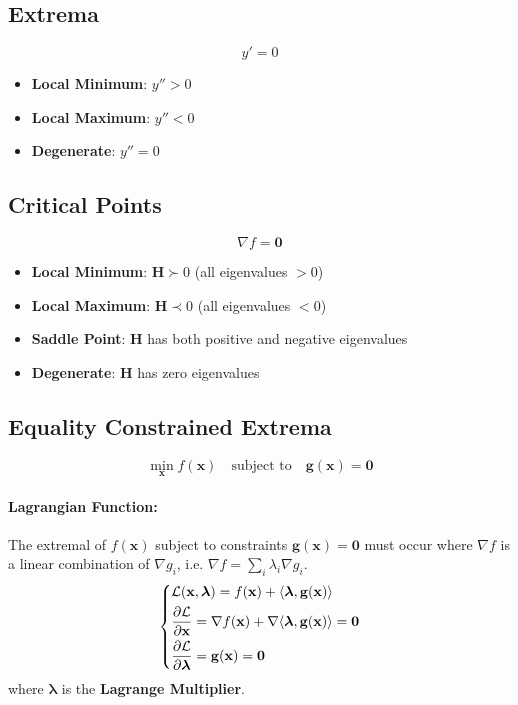 \documentclass{article}
\begin{document}
\subsection{Extrema}
\[
    y' = 0
\]
\begin{itemize}
    \item \textbf{Local Minimum}: $y'' > 0$
    \item \textbf{Local Maximum}: $y'' < 0$
    \item \textbf{Degenerate}: $y'' = 0$
\end{itemize}

\subsection{Critical Points}
\[
    \nabla f = \mathbf{0}
\]
\begin{itemize}
    \item \textbf{Local Minimum}: $\mathbf{H} \succ 0$ (all eigenvalues $> 0$)
    \item \textbf{Local Maximum}: $\mathbf{H} \prec 0$ (all eigenvalues $< 0$)
    \item \textbf{Saddle Point}: $\mathbf{H}$ has both positive and negative eigenvalues
    \item \textbf{Degenerate}: $\mathbf{H}$ has zero eigenvalues
\end{itemize}

\subsection{Equality Constrained Extrema}

\[
    \min_{\mathbf{x}} f(\mathbf{x}) \quad \text{subject to} \quad \mathbf{g}(\mathbf{x}) = \mathbf{0}
\]
\paragraph{Lagrangian Function:}
The extremal of $f(\mathbf{x})$ subject to constraints $\mathbf{g}(\mathbf{x}) = \mathbf{0}$ must occur where $\nabla f$ is a linear combination of $\nabla g_i$, i.e. $\displaystyle \nabla f = \sum_{i} \lambda_i \nabla g_i$.
\[
    \begin{dcases}
        \mathcal{L}(\mathbf{x}, \boldsymbol{\lambda}) = f(\mathbf{x}) + \langle \boldsymbol{\lambda}, \mathbf{g}(\mathbf{x}) \rangle \\
        \frac{\partial \mathcal{L}}{\partial \mathbf{x}} = \nabla f(\mathbf{x}) + \nabla \langle \boldsymbol{\lambda}, \mathbf{g}(\mathbf{x}) \rangle = \mathbf{0} \\
        \frac{\partial \mathcal{L}}{\partial \boldsymbol{\lambda}} = \mathbf{g}(\mathbf{x}) = \mathbf{0}
    \end{dcases}
\]
where $\boldsymbol{\lambda}$ is the \textbf{Lagrange Multiplier}.
\end{document}
